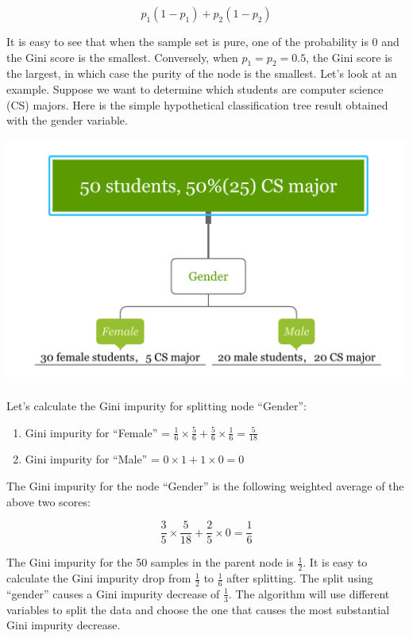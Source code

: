 \documentclass[12pt,]{krantz}
\providecommand{\tightlist}{%
  \setlength{\itemsep}{0pt}\setlength{\parskip}{0pt}}
\begin{document}
\[p_{1}(1-p_{1})+p_{2}(1-p_{2})\]

It is easy to see that when the sample set is pure, one of the probability is 0 and the Gini score is the smallest. Conversely, when \(p_{1}=p_{2}=0.5\), the Gini score is the largest, in which case the purity of the node is the smallest. Let's look at an example. Suppose we want to determine which students are computer science (CS) majors. Here is the simple hypothetical classification tree result obtained with the gender variable.

\includegraphics{images/giniEN.PNG}

Let's calculate the Gini impurity for splitting node ``Gender'':

\begin{enumerate}
\def\labelenumi{\arabic{enumi}.}
\tightlist
\item
  Gini impurity for ``Female'' = \(\frac{1}{6}\times\frac{5}{6}+\frac{5}{6}\times\frac{1}{6}=\frac{5}{18}\)
\item
  Gini impurity for ``Male'' = \(0\times1+1\times 0=0\)
\end{enumerate}

The Gini impurity for the node ``Gender'' is the following weighted average of the above two scores:

\[\frac{3}{5}\times\frac{5}{18}+\frac{2}{5}\times 0=\frac{1}{6}\]

The Gini impurity for the 50 samples in the parent node is \(\frac{1}{2}\). It is easy to calculate the Gini impurity drop from \(\frac{1}{2}\) to \(\frac{1}{6}\) after splitting. The split using ``gender'' causes a Gini impurity decrease of \(\frac{1}{3}\). The algorithm will use different variables to split the data and choose the one that causes the most substantial Gini impurity decrease.
\end{document}
